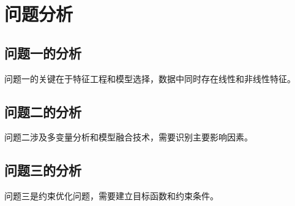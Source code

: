 \section{问题分析}

\subsection{问题一的分析}

问题一的关键在于特征工程和模型选择，数据中同时存在线性和非线性特征。

\subsection{问题二的分析}

问题二涉及多变量分析和模型融合技术，需要识别主要影响因素。

\subsection{问题三的分析}

问题三是约束优化问题，需要建立目标函数和约束条件。
